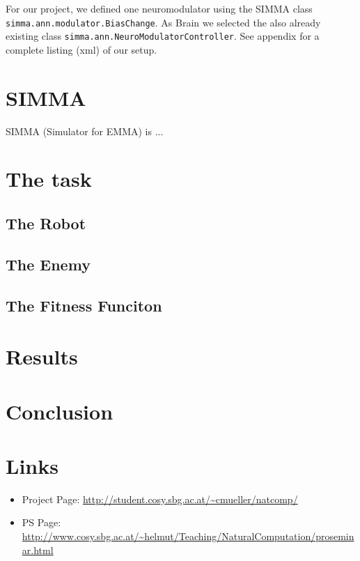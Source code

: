 \documentclass[12pt,fleqn,a4paper]{article}
\begin{document}
For our project, we defined one neuromodulator using the SIMMA class\\ \texttt{simma.ann.modulator.BiasChange}. As Brain we selected the also already existing class \texttt{simma.ann.NeuroModulatorController}. See appendix for a complete listing (xml) of our setup.


\section{SIMMA}
SIMMA (Simulator for EMMA) is ...

\section{The task}

\subsection{The Robot}

\subsection{The Enemy}

\subsection{The Fitness Funciton}

\section{Results}

\section{Conclusion}

\newpage



\section{Links}

\begin{itemize}
 \item Project Page: \url{http://student.cosy.sbg.ac.at/~cmueller/natcomp/}
 \item PS Page: \url{http://www.cosy.sbg.ac.at/~helmut/Teaching/NaturalComputation/proseminar.html}
\end{itemize}
\end{document}
